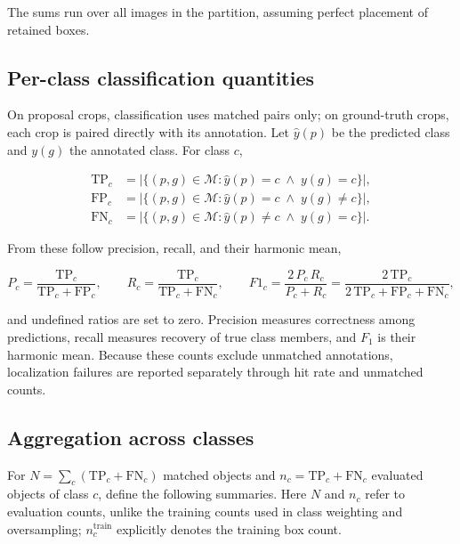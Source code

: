 \documentclass[a4paper,8pt]{article}
\begin{document}
The sums run over all images in the partition, assuming perfect placement of retained boxes.

\subsection{Per-class classification quantities}

On proposal crops, classification uses matched pairs only; on ground-truth crops, each crop
is paired directly with its annotation. Let $\hat{y}(p)$ be the predicted class and $y(g)$ the
annotated class. For class $c$,

\begin{align}
\mathrm{TP}_c &= \bigl|\{(p,g) \in \mathcal{M} : \hat{y}(p) = c \;\wedge\; y(g) = c\}\bigr|,
\label{eq:tp}\\
\mathrm{FP}_c &= \bigl|\{(p,g) \in \mathcal{M} : \hat{y}(p) = c \;\wedge\; y(g) \ne c\}\bigr|,
\label{eq:fp}\\
\mathrm{FN}_c &= \bigl|\{(p,g) \in \mathcal{M} : \hat{y}(p) \ne c \;\wedge\; y(g) = c\}\bigr| .
\label{eq:fn}
\end{align}

From these follow precision, recall, and their harmonic mean,

\begin{equation}
P_c = \frac{\mathrm{TP}_c}{\mathrm{TP}_c + \mathrm{FP}_c}, \qquad
R_c = \frac{\mathrm{TP}_c}{\mathrm{TP}_c + \mathrm{FN}_c}, \qquad
F1_c = \frac{2\,P_c\,R_c}{P_c + R_c} = \frac{2\,\mathrm{TP}_c}{2\,\mathrm{TP}_c + \mathrm{FP}_c + \mathrm{FN}_c},
\label{eq:prf}
\end{equation}

and undefined ratios are set to zero. Precision measures correctness among predictions, recall
measures recovery of true class members, and $F_1$ is their harmonic mean. Because these counts
exclude unmatched annotations, localization failures are reported separately through hit rate
and unmatched counts.

\subsection{Aggregation across classes}
\label{sec:aggregation}

For $N=\sum_c(\mathrm{TP}_c+\mathrm{FN}_c)$ matched objects and
$n_c=\mathrm{TP}_c+\mathrm{FN}_c$ evaluated objects of class $c$, define the following summaries.
Here $N$ and $n_c$ refer to evaluation counts, unlike the training counts used in class weighting
and oversampling; $n_c^{\mathrm{train}}$ explicitly denotes the training box count.
\end{document}
